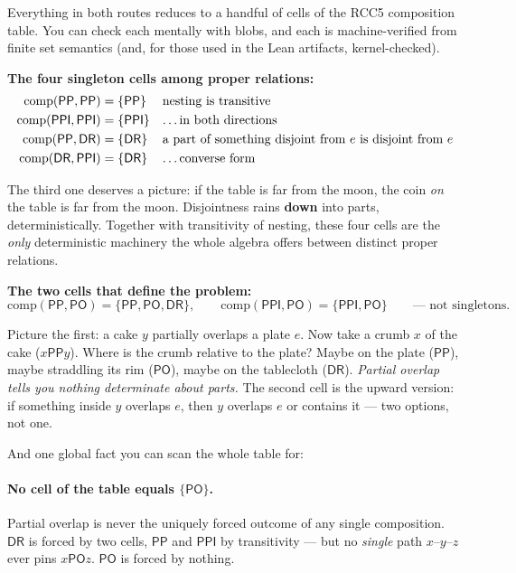 \documentclass[11pt]{article}
\newcommand{\DR}{\ensuremath{\mathsf{DR}}}
\newcommand{\PO}{\ensuremath{\mathsf{PO}}}
\newcommand{\PP}{\ensuremath{\mathsf{PP}}}
\newcommand{\PPI}{\ensuremath{\mathsf{PPI}}}
\newcommand{\Comp}{\mathrm{comp}}
\begin{document}
Everything in both routes reduces to a handful of cells of the RCC5
composition table. You can check each mentally with blobs, and each is
machine-verified from finite set semantics (and, for those used in the
Lean artifacts, kernel-checked).

\textbf{The four singleton cells among proper relations:}
\[
\begin{aligned}
\Comp(\PP,\PP)&=\{\PP\}   &&\text{nesting is transitive}\\
\Comp(\PPI,\PPI)&=\{\PPI\} &&\text{\dots in both directions}\\
\Comp(\PP,\DR)&=\{\DR\}   &&\text{a part of something disjoint from $e$
                              is disjoint from $e$}\\
\Comp(\DR,\PPI)&=\{\DR\}  &&\text{\dots converse form}
\end{aligned}
\]

The third one deserves a picture: if the table is far from the moon,
the coin \emph{on} the table is far from the moon. Disjointness rains
\textbf{down} into parts, deterministically. Together with transitivity
of nesting, these four cells are the \emph{only} deterministic
machinery the whole algebra offers between distinct proper relations.

\textbf{The two cells that define the problem:}
\[
\Comp(\PP,\PO)=\{\PP,\PO,\DR\},\qquad
\Comp(\PPI,\PO)=\{\PPI,\PO\}\qquad\text{--- not singletons.}
\]

Picture the first: a cake $y$ partially overlaps a plate $e$. Now take
a crumb $x$ of the cake ($x\mathbin{\PP}y$). Where is the crumb
relative to the plate? Maybe on the plate ($\PP$), maybe straddling its
rim ($\PO$), maybe on the tablecloth ($\DR$). \emph{Partial overlap
tells you nothing determinate about parts.} The second cell is the
upward version: if something inside $y$ overlaps $e$, then $y$ overlaps
$e$ or contains it --- two options, not one.

And one global fact you can scan the whole table for:

\paragraph{No cell of the table equals $\{\PO\}$.} Partial overlap is
never the uniquely forced outcome of any single composition. $\DR$ is
forced by two cells, $\PP$ and $\PPI$ by transitivity --- but no
\emph{single} path $x$--$y$--$z$ ever pins $x\mathbin{\PO}z$. $\PO$ is
forced by nothing.
\end{document}
